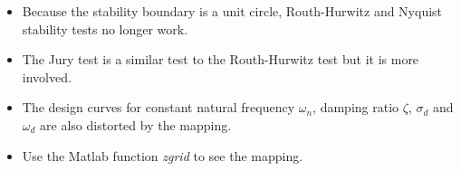 \begin{slide}\label{slide:l12s3}
\begin{itemize}
  \item Because the stability boundary is a unit circle, Routh-Hurwitz and Nyquist stability tests no longer work.
  \item The Jury test is a similar test to the Routh-Hurwitz test but it is more involved.
  \item The design curves for constant natural frequency $\omega_n$, damping ratio $\zeta$, $\sigma_d$ and $\omega_d$ are also distorted by the mapping.
  \item Use the Matlab function \emph{zgrid} to see the mapping.
\end{itemize}
\end{slide}

\begin{slide}\label{slide:l12s4}
  \begin{center}
  \end{center}
\end{slide}


\endinput

